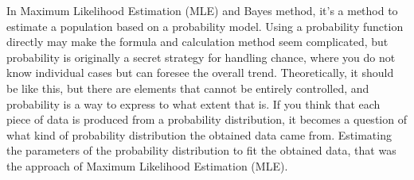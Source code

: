 \documentclass{ltjbook}
\begin{document}
In Maximum Likelihood Estimation (MLE) and Bayes method, it's a method to estimate a population based on a probability model. Using a probability function directly may make the formula and calculation method seem complicated, but probability is originally a secret strategy for handling chance, where you do not know individual cases but can foresee the overall trend. Theoretically, it should be like this, but there are elements that cannot be entirely controlled, and probability is a way to express to what extent that is. If you think that each piece of data is produced from a probability distribution, it becomes a question of what kind of probability distribution the obtained data came from. Estimating the parameters of the probability distribution to fit the obtained data, that was the approach of Maximum Likelihood Estimation (MLE).
\end{document}
